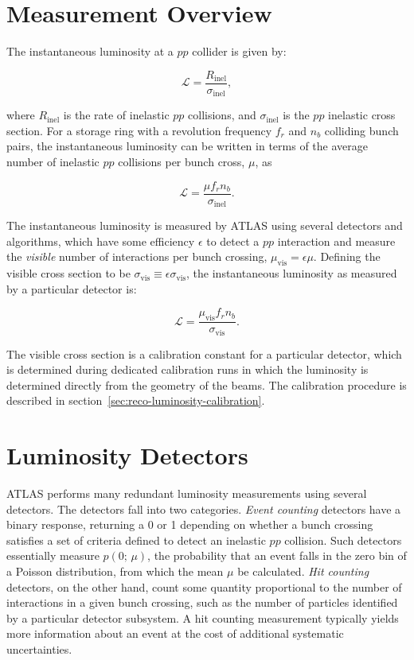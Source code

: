 
\section{Measurement Overview}\label{sec:luminosity-overview}
The instantaneous luminosity at a $pp$ collider is given by:

\begin{equation}
	\mathcal{L} = \frac{R_{\mathrm{inel}}}{\sigma_{\mathrm{inel}}},
\end{equation}

where $R_{\mathrm{inel}}$ is the rate of inelastic $pp$ collisions, and $\sigma_{\mathrm{inel}}$ is the $pp$ inelastic cross section. For a storage ring with a revolution frequency $f_r$ and $n_b$ colliding bunch pairs, the instantaneous luminosity can be written in terms of the average number of inelastic $pp$ collisions per bunch cross, $\mu$, as 

\begin{equation}
	\mathcal{L} = \frac{\mu f_r n_b}{\sigma_{\mathrm{inel}}}.
\end{equation}

The instantaneous luminosity is measured by ATLAS using several detectors and algorithms, which have some efficiency $\epsilon$ to detect a $pp$ interaction and measure the \emph{visible} number of interactions per bunch crossing, $\mu_{\mathrm{vis}} = \epsilon \mu$. Defining the visible cross section to be $\sigma_{\mathrm{vis}}\equiv \epsilon \sigma_{\mathrm{vis}}$, the instantaneous luminosity as measured by a particular detector is:

\begin{equation}\label{eqn:reco-luminosity-detected}
	\mathcal{L} = \frac{\mu_{\mathrm{vis}} f_r n_b}{\sigma_{\mathrm{vis}}}.
\end{equation}

The visible cross section is a calibration constant for a particular detector, which is determined during dedicated calibration runs in which the luminosity is determined directly from the geometry of the beams. The calibration procedure is described in section~\ref{sec:reco-luminosity-calibration}. 

\section{Luminosity Detectors}\label{sec:reco-luminosity-detectors}
ATLAS performs many redundant luminosity measurements using several detectors. The detectors fall into two categories. \emph{Event counting} detectors have a binary response, returning a 0 or 1 depending on whether a bunch crossing satisfies a set of criteria defined to detect an inelastic $pp$ collision. Such detectors essentially measure $p(0;\,\mu)$, the probability that an event falls in the zero bin of a Poisson distribution, from which the mean $\mu$ be calculated. \emph{Hit counting} detectors, on the other hand, count some quantity proportional to the number of interactions in a given bunch crossing, such as the number of particles identified by a particular detector subsystem. A hit counting measurement typically yields more information about an event at the cost of additional systematic uncertainties.

